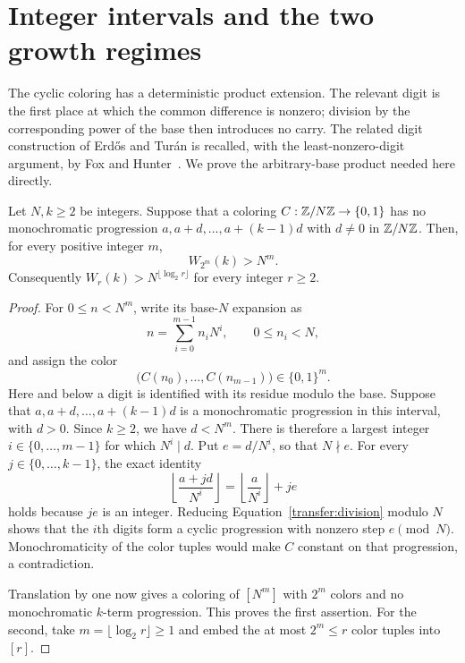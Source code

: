 \section{Integer intervals and the two growth regimes}
\label{sec:transfers}

The cyclic coloring has a deterministic product extension.  The relevant
digit is the first place at which the common difference is nonzero;
division by the corresponding power of the base then introduces no carry.
The related digit construction of Erd\H{o}s and Tur\'an
\cite[p.~263]{erdosTuran1936} is recalled, with the least-nonzero-digit
argument, by Fox and Hunter~\cite[Section~2]{foxHunter2026}.
We prove the arbitrary-base product needed here directly.

\begin{proposition}
\label{transfer:product}
Let $N,k\ge2$ be integers.  Suppose that a coloring
$C:\mathbb Z/N\mathbb Z\to\{0,1\}$ has no monochromatic progression
$a,a+d,\ldots,a+(k-1)d$ with $d\ne0$ in $\mathbb Z/N\mathbb Z$.
Then, for every positive integer $m$,
\[
 W_{2^m}(k)>N^m.
\]
Consequently $W_r(k)>N^{\lfloor\log_2r\rfloor}$ for every integer
$r\ge2$.
\end{proposition}

\begin{proof}
For $0\le n<N^m$, write its base-$N$ expansion as
\[
 n=\sum_{i=0}^{m-1}n_iN^i,\qquad 0\le n_i<N,
\]
and assign the color
\[
 \bigl(C(n_0),\ldots,C(n_{m-1})\bigr)\in\{0,1\}^m.
\]
Here and below a digit is identified with its residue modulo the base.
Suppose that $a,a+d,\ldots,a+(k-1)d$ is a monochromatic progression
in this interval, with $d>0$.  Since $k\ge2$, we have $d<N^m$.
There is therefore a largest integer $i\in\{0,\ldots,m-1\}$ for which
$N^i\mid d$.  Put $e=d/N^i$, so that $N\nmid e$.
For every $j\in\{0,\ldots,k-1\}$, the exact identity
\begin{equation}
 \left\lfloor\frac{a+jd}{N^i}\right\rfloor
 =\left\lfloor\frac a{N^i}\right\rfloor+je
 \label{transfer:division}
\end{equation}
holds because $je$ is an integer.  Reducing
Equation~\eqref{transfer:division} modulo $N$ shows that the $i$th
digits form a cyclic progression with nonzero step $e\pmod N$.
Monochromaticity of the color tuples would make $C$ constant on that
progression, a contradiction.

Translation by one now gives a coloring of $[N^m]$ with $2^m$ colors
and no monochromatic $k$-term progression.  This proves the first
assertion.  For the second, take $m=\lfloor\log_2r\rfloor\ge1$ and
embed the at most $2^m\le r$ color tuples into $[r]$.
\end{proof}

